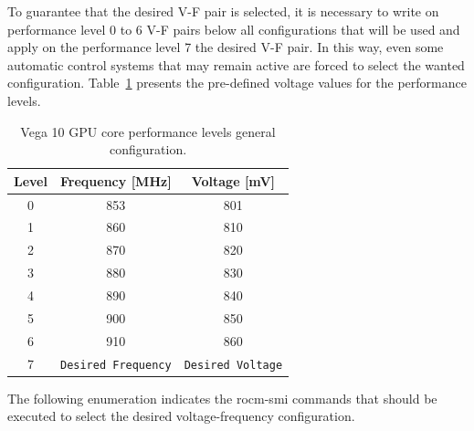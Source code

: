 To guarantee that the desired V-F pair is selected, it is necessary to write on performance level 0 to 6 V-F pairs below all configurations that will be used and apply on the performance level 7 the desired V-F pair. In this way, even some automatic control systems that may remain active are forced to select the wanted configuration. Table~\ref{tab:gpulevels-tunning} presents the pre-defined voltage values for the performance levels.

\begin{table}[!htb]
\centering
\begin{tabular}{ccc}
\textbf{Level} & \textbf{Frequency {[}MHz{]}} & \textbf{Voltage {[}mV{]}}  \\ \hline
0              & 853                          & 801                        \\
1              & 860                          & 810                      \\
2              & 870                          & 820                       \\
3              & 880                          & 830                      \\ 
4              & 890                          & 840                      \\
5              & 900                          & 850                     \\
6              & 910                          & 860                       \\
7              & \texttt{Desired Frequency}   & \texttt{Desired Voltage}                     \\ \hline
\end{tabular}
\caption{Vega 10 GPU core performance levels general configuration.}
\label{tab:gpulevels-tunning}
\end{table}

The following enumeration indicates the rocm-smi commands that should be executed to select the desired voltage-frequency configuration.

